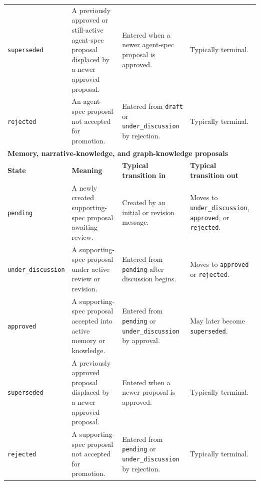 \begin{table}[htbp]
\begin{tabular}{p{2.7cm} p{4.4cm} p{4.1cm} p{4.1cm}}
\texttt{superseded} & A previously approved or still-active agent-spec proposal displaced by a newer approved proposal. & Entered when a newer agent-spec proposal is approved. & Typically terminal. \\
\texttt{rejected} & An agent-spec proposal not accepted for promotion. & Entered from \texttt{draft} or \texttt{under\_discussion} by rejection. & Typically terminal. \\
\hline
\multicolumn{4}{l}{\textbf{Memory, narrative-knowledge, and graph-knowledge proposals}} \\
\hline
\textbf{State} & \textbf{Meaning} & \textbf{Typical transition in} & \textbf{Typical transition out} \\
\hline
\texttt{pending} & A newly created supporting-spec proposal awaiting review. & Created by an initial or revision message. & Moves to \texttt{under\_discussion}, \texttt{approved}, or \texttt{rejected}. \\
\texttt{under\_discussion} & A supporting-spec proposal under active review or revision. & Entered from \texttt{pending} after discussion begins. & Moves to \texttt{approved} or \texttt{rejected}. \\
\texttt{approved} & A supporting-spec proposal accepted into active memory or knowledge. & Entered from \texttt{pending} or \texttt{under\_discussion} by approval. & May later become \texttt{superseded}. \\
\texttt{superseded} & A previously approved proposal displaced by a newer approved proposal. & Entered when a newer proposal is approved. & Typically terminal. \\
\texttt{rejected} & A supporting-spec proposal not accepted for promotion. & Entered from \texttt{pending} or \texttt{under\_discussion} by rejection. & Typically terminal. \\
\hline
\end{tabular}
\end{table}
